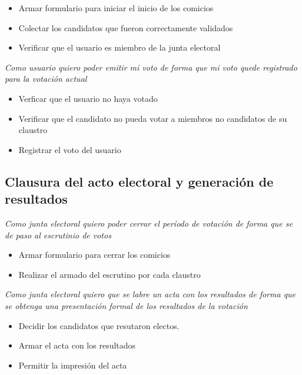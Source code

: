 \begin{itemize}
 \item Armar formulario para iniciar el inicio de los comicios
 \item Colectar los candidatos que fueron correctamente validados 
 \item Verificar que el usuario es miembro de la junta electoral
\end{itemize}

\medskip

\textsl{Como usuario quiero poder emitir mi voto de forma que mi voto quede registrado para la votaci\'on actual}

\begin{itemize}
 \item Verficar que el usuario no haya votado
 \item Verificar que el candidato no pueda votar a miembros no candidatos de su claustro
 \item Registrar el voto del usuario
\end{itemize}

\bigskip

\subsection*{Clausura del acto electoral y generaci\'on de resultados}

\textsl{Como junta electoral quiero poder cerrar el per\'iodo de votaci\'on de forma que se de paso al escrutinio de votos}

\begin{itemize}
 \item Armar formulario para cerrar los comicios
 \item Realizar el armado del escrutino por cada claustro
\end{itemize}

\medskip

\textsl{Como junta electoral quiero que se labre un acta con los resultados de forma que se obtenga una presentaci\'on formal de los resultados de la votaci\'on}

\begin{itemize}
 \item Decidir los candidatos que resutaron electos.
 \item Armar el acta con los resultados
 \item Permitir la impresi\'on del acta
\end{itemize}

\bigskip
  


